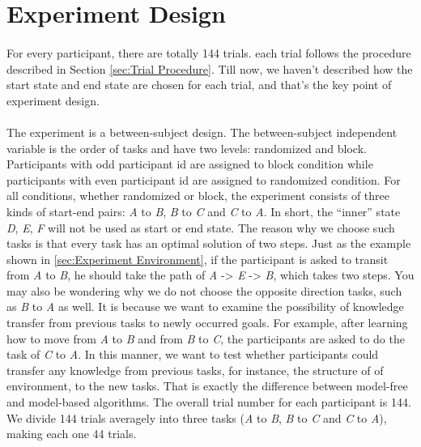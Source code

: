 \section{Experiment Design}
\label{sec:Experiment Design}
\paragraph{}
For every participant, there are totally 144 trials. each trial follows the procedure described in Section \ref{sec:Trial Procedure}. Till now, we haven't described how the start state and end state are chosen for each trial, and that's the key point of experiment design. 
\paragraph{}
The experiment is a between-subject design. The between-subject independent variable is the order of tasks and have two levels: randomized and block. Participants with odd participant id are assigned to block condition while participants with even participant id are assigned to randomized condition. For all conditions, whether randomized or block, the experiment consists of three kinds of start-end pairs: \emph{A} to \emph{B}, \emph{B} to \emph{C} and \emph{C} to \emph{A}. In short, the \enquote{inner} state \emph{D}, \emph{E}, \emph{F} will not be used as start or end state. The reason why we choose such tasks is that every task has an optimal solution of two steps. Just as the example shown in \ref{sec:Experiment Environment}, if the participant is asked to transit from \emph{A} to \emph{B}, he should take the path of \emph{A} -> \emph{E} -> \emph{B}, which takes two steps. You may also be wondering why we do not choose the opposite direction tasks, such as \emph{B} to \emph{A} as well. It is because we want to examine the possibility of knowledge transfer from previous tasks to newly occurred goals. For example, after learning how to move from \emph{A} to \emph{B} and from \emph{B} to \emph{C}, the participants are asked to do the task of \emph{C} to \emph{A}. In this manner, we want to test whether participants could transfer any knowledge from previous tasks, for instance, the structure of of environment, to the new tasks. That is exactly the difference between model-free and model-based algorithms. The overall trial number for each participant is 144. We divide 144 trials averagely into three tasks (\emph{A} to \emph{B}, \emph{B} to \emph{C} and \emph{C} to \emph{A}), making each one 44 trials. 
